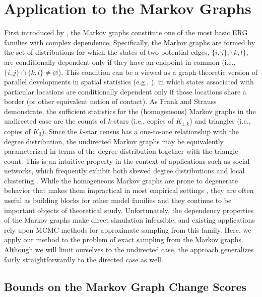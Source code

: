 \documentclass[11pt]{article}
\begin{document}
\section{Application to the Markov Graphs}

First introduced by \citet{frank.strauss:jasa:1986}, the Markov graphs constitute one of the most basic ERG families with complex dependence.  Specifically, the Markov graphs are formed by the set of distributions for which the states of two potential edges, $\{i,j\},\{k,l\}$, are conditionally dependent only if they have an endpoint in common (i.e., $\{i,j\}\cap\{k,l\} \neq \varnothing$).  This condition can be a viewed as a graph-theoretic version of parallel developments in spatial statistics (e.g., \citet{besag:ts:1975}), in which states associated with particular locations are conditionally dependent only if those locations share a border (or other equivalent notion of contact).  As Frank and Strauss demonstrate, the sufficient statistics for the (homogeneous) Markov graphs in the undirected case are the counts of $k$-stars (i.e., copies of $K_{1,k}$) and triangles (i.e., copies of $K_3$).  Since the $k$-star census has a one-to-one relationship with the degree distribution, the undirected Markov graphs may be equivalently parameterized in terms of the degree distribution together with the triangle count.  This is an intuitive property in the context of applications such as social networks, which frequently exhibit both skewed degree distributions and local clustering \citep{davis:asr:1970,holland.leinhardt:ajs:1972,snijders:sn:1981}.  While the homogeneous Markov graphs are prone to degenerate behavior that makes them impractical in most empirical settings \citep{schweinberger:jasa:2011}, they are often useful as building blocks for other model families \citep[see e.g.][]{schweinberger.handcock:jrssB:2015} and they continue to be important objects of theoretical study.  Unfortunately, the dependency properties of the Markov graphs make direct simulation infeasible, and existing applications rely upon MCMC methods for approximate sampling from this family.  Here, we apply our method to the problem of exact sampling from the Markov graphs.  Although we will limit ourselves to the undirected case, the approach generalizes fairly straightforwardly to the directed case as well.

\subsection{Bounds on the Markov Graph Change Scores \label{sec_mgbounds}}
\end{document}
